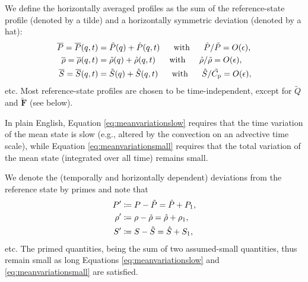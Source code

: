 \documentclass[12pt]{article}
\newcommand{\vecf}{\bm{F}}
\begin{document}
We define the horizontally averaged profiles as the sum of the reference-state profile (denoted by a tilde) and a horizontally symmetric deviation (denoted by a hat):
\begin{subequations}\label{eq:meanvariationsmall}
\begin{align}
\overline{P}=	\overline{P}(q,t) &= \tilde{P}(q) + \hat{P}(q,t)\ \ \ \ \ \text{with}\ \ \ \ \  \hat{P}/\tilde{P} = O(\epsilon),\\
\overline{\rho}=	\overline{\rho}(q,t)  &= \tilde{\rho}(q)  + \hat{\rho}(q,t)\ \ \ \ \ \text{with}\ \ \ \ \  \hat{\rho}/\tilde{\rho} = O(\epsilon),\\
	\overline{S} = \overline{S} (q,t) &=  \tilde{S}(q)  + \hat{S}(q,t)\ \ \ \ \ \text{with}\ \ \ \ \  \hat{S}/\tilde{C_{\rm{p}}} =O(\epsilon),
\end{align}
\end{subequations}
etc. Most reference-state profiles are chosen to be time-independent, except for $\tilde{Q}$ and $\tilde{\vecf}$ (see below). 

In plain English, Equation \eqref{eq:meanvariationslow} requires that the time variation of the mean state is slow (e.g., altered by the convection on an advective time scale), while Equation \eqref{eq:meanvariationsmall} requires that the total variation of the mean state (integrated over all time) remains small. 

We denote the (temporally and horizontally dependent) deviations from the reference state by primes and note that 
\begin{subequations}\label{eq:defprime}
\begin{align}
	P^\prime & \coloneqq P - \tilde{P} =\hat{P} +  P_1,\\
	\rho^\prime & \coloneqq \rho - \tilde{\rho} = \hat{\rho} + \rho_1,\\
	S^\prime & \coloneqq S -  \tilde{S} =  \hat{S} + S_1,
\end{align}
\end{subequations}
etc. The primed quantities, being the sum of two assumed-small quantities, thus remain small as long Equations \eqref{eq:meanvariationslow} and \eqref{eq:meanvariationsmall} are satisfied. 
\end{document}
